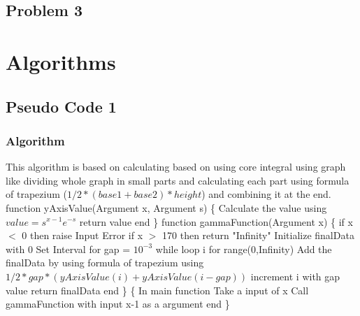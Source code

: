 \documentclass{article}
\begin{document}
\begin{center}
    \section*{Problem 3}
\end{center}

\section{Algorithms}
\subsection{Pseudo Code 1}
\subsubsection{Algorithm}
This algorithm is based on calculating based on using core integral using graph like dividing whole graph in small parts and calculating each part using formula of trapezium ($ 1/2*(base1 + base2)*height $) and combining it at the end.\newline\newline
function yAxisValue(Argument x, Argument s) \{ \newline
\indent \indent Calculate the value using $value = {s^{x - 1} e^{ - s}}$\newline
\indent \indent return value\newline
end \newline
\}  \newline
 function gammaFunction(Argument x) \{ \newline
\indent \indent if x $<$ 0\newline
\indent \indent \indent \indent then raise Input Error\newline
\indent \indent if x $>$ 170\newline
\indent \indent \indent \indent then return "Infinity"\newline\newline
\indent \indent Initialize finalData with 0\newline
\indent \indent Set Interval for gap = $10 ^ {-3}$ \newline\newline
\indent \indent while loop i for range(0,Infinity)\newline
\indent \indent \indent \indent Add the finalData by using formula of trapezium using \newline 
\indent \indent \indent \indent \textbf{$1/2*gap*(yAxisValue(i) + yAxisValue(i-gap))$} \newline
\indent \indent \indent \indent increment i with gap value \newline
\indent \indent return finalData\newline
end \newline
\} \newline
\{ \newline
In main function \newline
\indent \indent Take a input of x \newline
\indent \indent Call gammaFunction with input x-1 as a argument \newline
end\newline
\}
\end{document}
